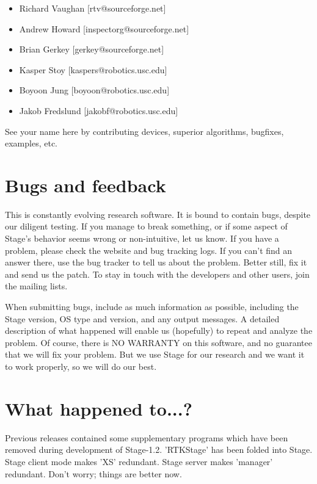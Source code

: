 \documentclass[11pt]{report}
\def\VERSION {1.2}
\begin{document}
      \begin{itemize}
      \item[] Richard Vaughan [rtv@sourceforge.net]
      \item[] Andrew Howard [inspectorg@sourceforge.net]
      \item[] Brian Gerkey [gerkey@sourceforge.net]
      \item[] Kasper Stoy [kaspers@robotics.usc.edu]
      \item[] Boyoon Jung [boyoon@robotics.usc.edu]
      \item[] Jakob Fredslund [jakobf@robotics.usc.edu]
      \end{itemize}

	See your name here by contributing devices, superior
	algorithms, bugfixes, examples, etc.

  \section{Bugs and feedback}
  
    This is constantly evolving research software. It is bound to
    contain bugs, despite our diligent testing.  If you manage to
    break something, or if some aspect of Stage's behavior seems wrong
    or non-intuitive, let us know. If you have a problem, please check
    the website and bug tracking logs. If you can't find an answer
    there, use the bug tracker to tell us about the problem. Better
    still, fix it and send us the patch. To stay in touch with the
    developers and other users, join the mailing lists.

    When submitting bugs, include as much information as possible,
    including the Stage version, OS type and version, and any output
    messages.  A detailed description of what happened will enable us
    (hopefully) to repeat and analyze the problem.  Of course, there
    is NO WARRANTY on this software, and no guarantee that we will fix
    your problem.  But we use Stage for our research and we want it to
    work properly, so we will do our best.

  \section{What happened to...?}
	
	Previous releases contained some supplementary programs which
	have been removed during development of
	Stage-\VERSION. 'RTKStage' has been folded into Stage. Stage
	client mode makes 'XS' redundant. Stage server makes 'manager'
	redundant. Don't worry; things are better now.
\end{document}
